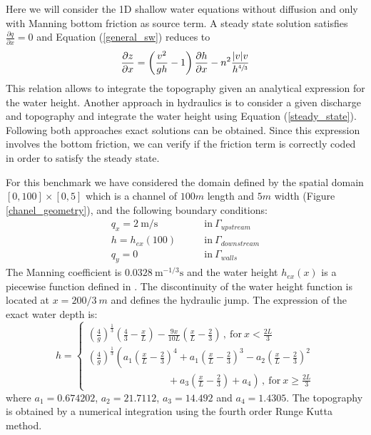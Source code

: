 \documentclass[a4paper,12pt]{elsarticle}
\newcommand{\pder}[2]{\frac{\partial#1}{\partial#2}}
\newcommand{\abs}[1]{\lvert#1\rvert}
\begin{document}
Here we will consider the 1D shallow water equations without diffusion and only with Manning bottom friction as source term. A steady state solution satisfies $\pder{q}{x}=0$ and Equation (\ref{general_sw}) reduces to
\begin{equation} \label{steady_state}
\pder{z}{x} = \left(\frac{v^2}{gh}-1\right) \pder{h}{x} - n^2\frac{\abs{v}v}{h^{\sfrac{4}{3}}}
\end{equation}
This relation allows to integrate the topography given an analytical expression for the water height. Another approach in hydraulics is to consider a given discharge and topography and integrate the water height using Equation (\ref{steady_state}). Following both approaches exact solutions can be obtained. Since this expression involves the bottom friction, we can verify if the friction term is correctly coded in order to satisfy the steady state.

For this benchmark we have considered the domain defined by the spatial domain $[0,100]\times[0,5]$ which is a channel of $100m$ length and $5m$ width (Figure \ref{chanel_geometry}), and the following boundary conditions:
\begin{equation}
\begin{split}
    q_x = 2\ \text{m/s} \qquad &\text{in} \ \Gamma_{upstream} \\
    h = h_{ex}(100) \qquad &\text{in} \ \Gamma_{downstream} \\
    q_y = 0 \qquad &\text{in} \ \Gamma_{walls}
\end{split}
\end{equation}
The Manning coefficient is $0.0328\ \text{m}^{-1/3}\text{s}$ and the water height $h_{ex}(x)$ is a piecewise function defined in \cite{delestre2013}. The discontinuity of the water height function is located at $x=200/3\ m$ and defines the hydraulic jump. The expression of the exact water depth is:
\begin{equation} \label{jump_height_definition}
    h = \begin{cases}
        \left(\frac{4}{g}\right)^\frac{1}{3} \left(\frac{4}{3} - \frac{x}{L}\right) - \frac{9x}{10L}
            \left(\frac{x}{L} - \frac{2}{3}\right) \, ,\ \text{for} \ x < \frac{2L}{3}\\
        \left(\frac{4}{g}\right)^\frac{1}{3} \left(
              a_1 \left(\frac{x}{L} - \frac{2}{3}\right)^4
            + a_1 \left(\frac{x}{L} - \frac{2}{3}\right)^3
            - a_2 \left(\frac{x}{L} - \frac{2}{3}\right)^2 \right. \\ \left. \qquad\qquad\qquad\qquad
            + a_3 \left(\frac{x}{L} - \frac{2}{3}\right)
            + a_4
        \right) \, ,\ \text{for} \ x \geq \frac{2L}{3}
    \end{cases}
\end{equation}
where $a_1=0.674202$, $a_2=21.7112$, $a_3=14.492$ and $a_4=1.4305$. The topography is obtained by a numerical integration using the fourth order Runge Kutta method.
\end{document}
